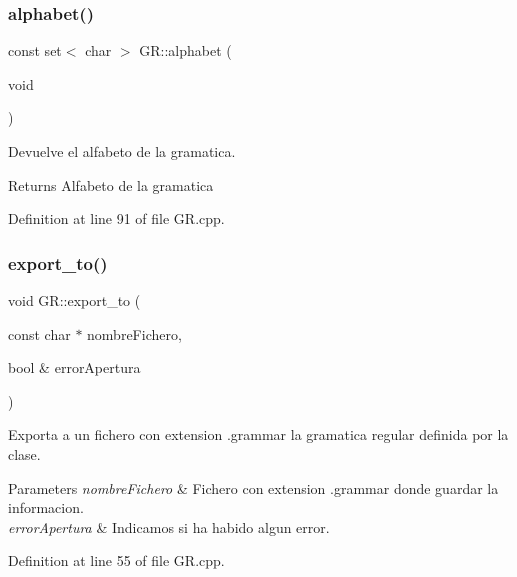 \subsubsection{\texorpdfstring{alphabet()}{alphabet()}}
{\footnotesize\ttfamily const set$<$ char $>$ G\+R\+::alphabet (\begin{DoxyParamCaption}\item[{void}]{ }\end{DoxyParamCaption})}



Devuelve el alfabeto de la gramatica. 

\begin{DoxyReturn}{Returns}
Alfabeto de la gramatica 
\end{DoxyReturn}


Definition at line 91 of file G\+R.\+cpp.

\mbox{\label{class_g_r_a5c4dca6e2174446585a234b4e8792743}} 
\subsubsection{\texorpdfstring{export\+\_\+to()}{export\_to()}}
{\footnotesize\ttfamily void G\+R\+::export\+\_\+to (\begin{DoxyParamCaption}\item[{const char $\ast$}]{nombre\+Fichero,  }\item[{bool \&}]{error\+Apertura }\end{DoxyParamCaption})}



Exporta a un fichero con extension \textquotesingle{}.grammar\textquotesingle{} la gramatica regular definida por la clase. 


\begin{DoxyParams}{Parameters}
{\em nombre\+Fichero} & Fichero con extension \textquotesingle{}.grammar\textquotesingle{} donde guardar la informacion. \\
\hline
{\em error\+Apertura} & Indicamos si ha habido algun error. \\
\hline
\end{DoxyParams}


Definition at line 55 of file G\+R.\+cpp.

\mbox{\label{class_g_r_aa621faa9150e57848b3b2b11a52c4fa5}} 
